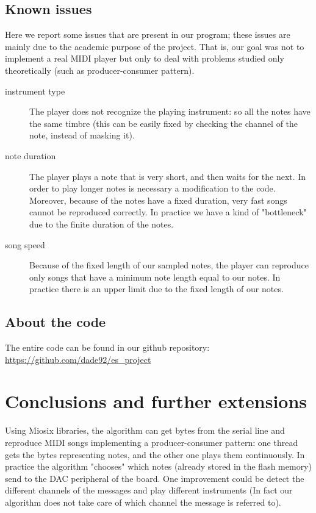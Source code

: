 \documentclass[12pt]{article}
\begin{document}
\subsection{Known issues}
Here we report some issues that are present in our program; these issues are mainly due to the academic purpose of the project. That is, our goal was not to implement a real MIDI player but only to deal with problems studied only theoretically (such as producer-consumer pattern).
\begin{description}
	\item[instrument type] The player does not recognize the playing instrument: so all the notes have the same timbre (this can be easily fixed by checking the channel of the note, instead of masking it).
	\item[note duration] The player plays a note that is very short, and then waits for the next. In order to play longer notes is necessary a modification to the code. Moreover, because of the notes have a fixed duration, very fast songs cannot be reproduced correctly. In practice we have a kind of "bottleneck" due to the finite duration of the notes.
	\item[song speed] Because of the fixed length of our sampled notes, the player can reproduce only songs that have a minimum note length equal to our notes. In practice there is an upper limit due to the fixed length of our notes.
\end{description}

\subsection{About the code}
The entire code can be found in our github repository: \url{https://github.com/dade92/es_project}

\section{Conclusions and further extensions}
Using Miosix libraries, the algorithm can get bytes from the serial line and reproduce MIDI songs implementing a producer-consumer pattern: one thread gets the bytes representing notes, and the other one plays them continuously. In practice the algorithm "chooses" which notes (already stored in the flash memory) send to the DAC peripheral of the board. One improvement could be detect the different channels of the messages and play different instruments (In fact our algorithm does not take care of which channel the message is referred to). 
\end{document}
